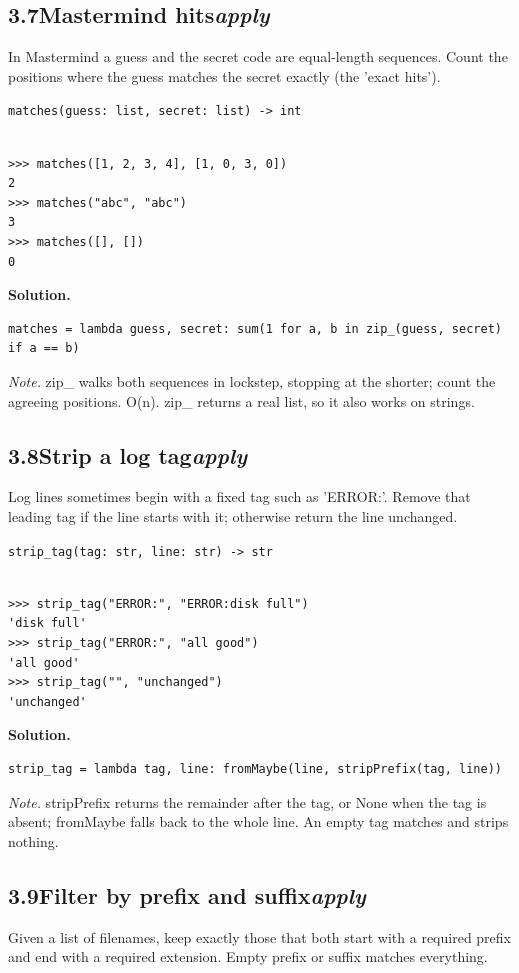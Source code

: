 \documentclass[10pt,letterpaper]{book}
\begin{document}
\subsection*{3.7\quad Mastermind hits\hfill\textnormal{\textit{apply}}}
In Mastermind a guess and the secret code are equal-length sequences. Count the positions where the guess matches the secret exactly (the 'exact hits').

\noindent\texttt{matches(guess: list, secret: list) -> int}
\begin{lstlisting}[style=ex]

>>> matches([1, 2, 3, 4], [1, 0, 3, 0])
2
>>> matches("abc", "abc")
3
>>> matches([], [])
0

\end{lstlisting}
\noindent\textbf{Solution.}
\begin{lstlisting}[style=code]
matches = lambda guess, secret: sum(1 for a, b in zip_(guess, secret) if a == b)
\end{lstlisting}
\noindent\textit{Note.} zip\_ walks both sequences in lockstep, stopping at the shorter; count the agreeing positions. O(n). zip\_ returns a real list, so it also works on strings.

\subsection*{3.8\quad Strip a log tag\hfill\textnormal{\textit{apply}}}
Log lines sometimes begin with a fixed tag such as 'ERROR:'. Remove that leading tag if the line starts with it; otherwise return the line unchanged.

\noindent\texttt{strip\_tag(tag: str, line: str) -> str}
\begin{lstlisting}[style=ex]

>>> strip_tag("ERROR:", "ERROR:disk full")
'disk full'
>>> strip_tag("ERROR:", "all good")
'all good'
>>> strip_tag("", "unchanged")
'unchanged'

\end{lstlisting}
\noindent\textbf{Solution.}
\begin{lstlisting}[style=code]
strip_tag = lambda tag, line: fromMaybe(line, stripPrefix(tag, line))
\end{lstlisting}
\noindent\textit{Note.} stripPrefix returns the remainder after the tag, or None when the tag is absent; fromMaybe falls back to the whole line. An empty tag matches and strips nothing.

\subsection*{3.9\quad Filter by prefix and suffix\hfill\textnormal{\textit{apply}}}
Given a list of filenames, keep exactly those that both start with a required prefix and end with a required extension. Empty prefix or suffix matches everything.
\end{document}
